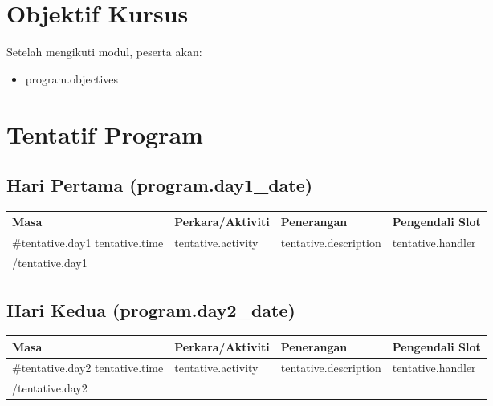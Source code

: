 \documentclass[a4paper,12pt]{article}
\begin{document}
\section{Objektif Kursus}
Setelah mengikuti modul, peserta akan:
\begin{itemize}
    \item {{program.objectives}}
\end{itemize}

\section{Tentatif Program}
\subsection{Hari Pertama ({{program.day1_date}})}
\begin{longtable}{|p{2cm}|p{3cm}|p{7cm}|p{3cm}|}
    \hline
    \rowcolor{lightgray}
    \textbf{Masa} & \textbf{Perkara/Aktiviti} & \textbf{Penerangan} & \textbf{Pengendali Slot} \\
    \hline
    \endhead
    {{#tentative.day1}}
    {{tentative.time}} & {{tentative.activity}} & {{tentative.description}} & {{tentative.handler}} \\
    \hline
    {{/tentative.day1}}
\end{longtable}

\subsection{Hari Kedua ({{program.day2_date}})}
\begin{longtable}{|p{2cm}|p{3cm}|p{7cm}|p{3cm}|}
    \hline
    \rowcolor{lightgray}
    \textbf{Masa} & \textbf{Perkara/Aktiviti} & \textbf{Penerangan} & \textbf{Pengendali Slot} \\
    \hline
    \endhead
    {{#tentative.day2}}
    {{tentative.time}} & {{tentative.activity}} & {{tentative.description}} & {{tentative.handler}} \\
    \hline
    {{/tentative.day2}}
\end{longtable}

\end{document}
